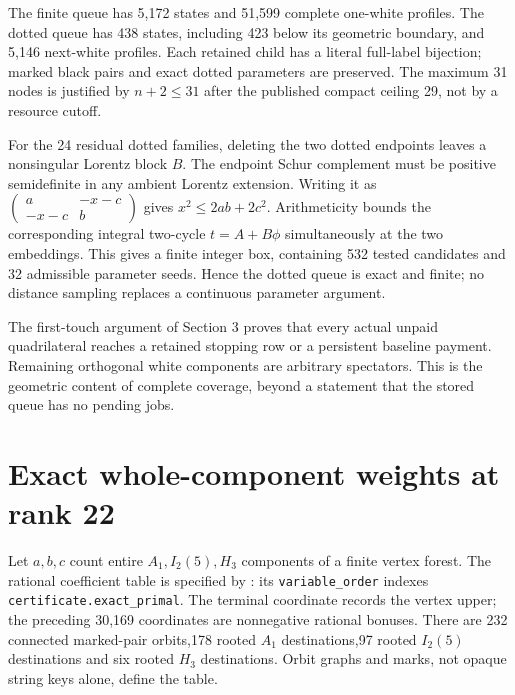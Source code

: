 \documentclass[11pt]{article}
\begin{document}
The finite queue has 5,172 states and 51,599 complete one-white profiles.
The dotted queue has 438 states, including 423 below its geometric boundary,
and 5,146 next-white profiles. Each retained child has a literal full-label
bijection; marked black pairs and exact dotted parameters are preserved.
The maximum 31 nodes is justified by $n+2\le 31$ after the published
compact ceiling 29, not by a resource cutoff.

For the 24 residual dotted families, deleting the two dotted endpoints
leaves a nonsingular Lorentz block $B$. The endpoint Schur complement
must be positive semidefinite in any ambient Lorentz extension. Writing
it as $\left(\begin{smallmatrix}a&-x-c\\-x-c&b\end{smallmatrix}\right)$
gives $x^2\le 2ab+2c^2$. Arithmeticity bounds the corresponding integral
two-cycle $t=A+B\phi$ simultaneously at the two embeddings. This gives
a finite integer box, containing 532 tested candidates and 32 admissible
parameter seeds. Hence the dotted queue is exact and finite; no distance
sampling replaces a continuous parameter argument.

The first-touch argument of Section 3 proves that every actual unpaid
quadrilateral reaches a retained stopping row or a persistent baseline
payment. Remaining orthogonal white components are arbitrary spectators.
This is the geometric content of complete coverage, beyond a statement
that the stored queue has no pending jobs.

\section{Exact whole-component weights at rank 22}
Let $a,b,c$ count entire $A_1,I_2(5),H_3$ components of a finite vertex
forest. The rational coefficient table is specified by
:
its \texttt{variable\_order} indexes \texttt{certificate.exact\_primal}.
The terminal coordinate records the vertex upper; the preceding 30,169
coordinates are nonnegative rational bonuses. There are 232 connected
marked-pair orbits,178 rooted $A_1$ destinations,97 rooted $I_2(5)$
destinations and six rooted $H_3$ destinations. Orbit graphs and marks,
not opaque string keys alone, define the table.
\end{document}
